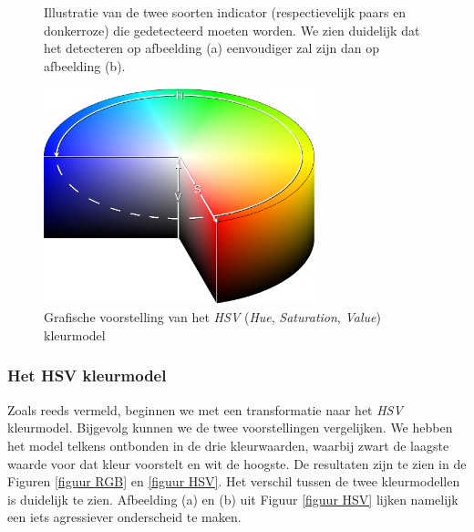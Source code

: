 \documentclass[a4paper,kulak]{kulakarticle}
\begin{document}
\begin{figure}[H]
	\centering
	\qquad
	
	\caption{Illustratie van de twee soorten indicator (respectievelijk paars en donkerroze) die gedetecteerd moeten worden. We zien duidelijk dat het detecteren op afbeelding (a) eenvoudiger zal zijn dan op afbeelding (b).}
	\label{figuur indicators}
\end{figure}

\begin{figure}[H]
	\centering
	\includegraphics[width=0.7\textwidth]{HSV_vb.png}
	
	\caption{Grafische voorstelling van het \textit{HSV} (\textit{Hue}, \textit{Saturation}, \textit{Value}) kleurmodel}
	\label{figuur hsv_schema}
\end{figure}

\subsubsection{Het HSV kleurmodel}
Zoals reeds vermeld, beginnen we met een transformatie naar het \textit{HSV} kleurmodel. Bijgevolg kunnen we de twee voorstellingen vergelijken. We hebben het model telkens ontbonden in de drie kleurwaarden, waarbij zwart de laagste waarde voor dat kleur voorstelt en wit de hoogste. De resultaten zijn te zien in de Figuren \ref{figuur RGB} en \ref{figuur HSV}. Het verschil tussen de twee kleurmodellen is duidelijk te zien. Afbeelding (a) en (b) uit Figuur \ref{figuur HSV} lijken namelijk een iets agressiever onderscheid te maken.
\end{document}
